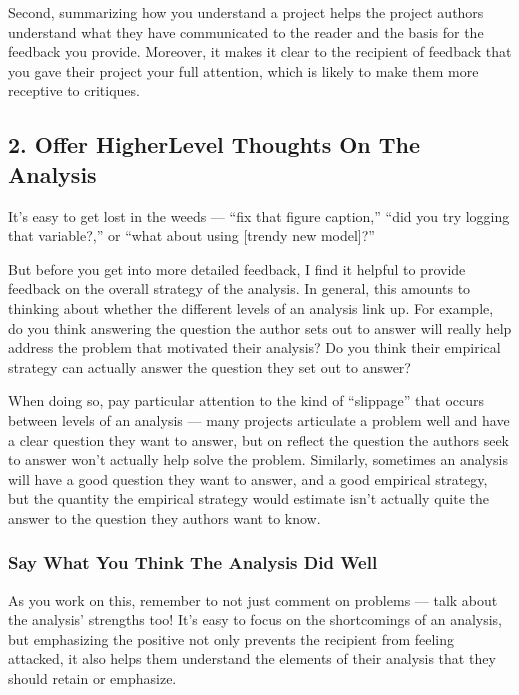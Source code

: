 \documentclass[letterpaper,10pt,english]{jupyterBook}
\begin{document}
\sphinxAtStartPar
Second, summarizing how you understand a project helps the project authors understand what they have communicated to the reader and the basis for the feedback you provide. Moreover, it makes it clear to the recipient of feedback that you gave their project your full attention, which is likely to make them more receptive to critiques.


\subsection{2. Offer Higher\sphinxhyphen{}Level Thoughts On The Analysis}
\label{\detokenize{40_in_practice/30_giving_feedback:offer-higher-level-thoughts-on-the-analysis}}
\sphinxAtStartPar
It’s easy to get lost in the weeds — “fix that figure caption,” “did you try logging that variable?,” or “what about using {[}trendy new model{]}?”

\sphinxAtStartPar
But before you get into more detailed feedback, I find it helpful to provide feedback on the overall strategy of the analysis. In general, this amounts to thinking about whether the different levels of an analysis link up. For example, do you think answering the question the author sets out to answer will really help address the problem that motivated their analysis? Do you think their empirical strategy can actually answer the question they set out to answer?

\sphinxAtStartPar
When doing so, pay particular attention to the kind of “slippage” that occurs between levels of an analysis — many projects articulate a problem well and have a clear question they want to answer, but on reflect the question the authors seek to answer won’t actually help solve the problem. Similarly, sometimes an analysis will have a good question they want to answer, and a good empirical strategy, but the quantity the empirical strategy would estimate isn’t actually quite the answer to the question they authors want to know.


\subsubsection{Say What You Think The Analysis Did Well}
\label{\detokenize{40_in_practice/30_giving_feedback:say-what-you-think-the-analysis-did-well}}
\sphinxAtStartPar
As you work on this, remember to not just comment on problems — talk about the analysis’ strengths too! It’s easy to focus on the short\sphinxhyphen{}comings of an analysis, but emphasizing the positive not only prevents the recipient from feeling attacked, it also helps them understand the elements of their analysis that they should retain or emphasize.
\end{document}

